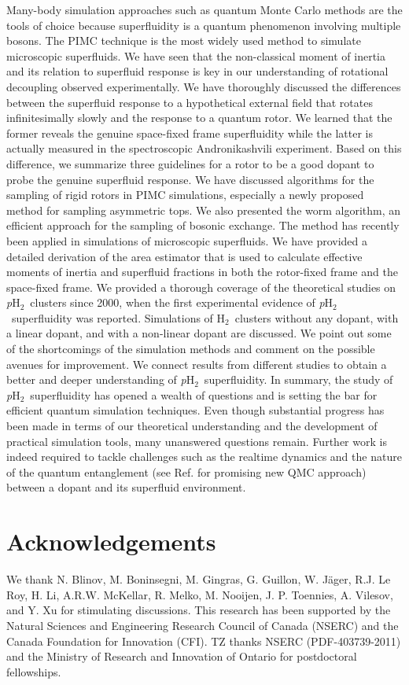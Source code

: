 \documentclass[12pt]{iopart}
\newcommand{\hydrogen}{H$_2$}
\newcommand{\phtwo}{{\em p}H$_2$}
\begin{document}
Many-body simulation approaches such as quantum Monte Carlo methods are the tools of choice because superfluidity is a quantum phenomenon involving multiple bosons. 
The PIMC technique is the most widely used method to simulate microscopic superfluids. We have seen that the non-classical moment of inertia and its relation to superfluid response is key in our understanding of rotational decoupling observed experimentally. 
We have thoroughly discussed the differences between the superfluid response to a hypothetical external field that rotates infinitesimally slowly and the response to a quantum rotor. We learned that the former reveals the genuine space-fixed frame superfluidity while the latter is actually measured in the spectroscopic Andronikashvili experiment. Based on this difference, we summarize three guidelines for a rotor to be a good dopant to probe the genuine superfluid response.
We have discussed  algorithms for the sampling of rigid rotors in PIMC simulations, especially a newly proposed method for sampling asymmetric tops. 
We also presented the worm algorithm, an efficient approach for the sampling of bosonic exchange.
The method has  recently been applied in simulations of microscopic superfluids.
We have provided a detailed derivation of the area estimator that is used to calculate effective moments of inertia and superfluid fractions in both the rotor-fixed  frame and the space-fixed frame.
We provided a thorough coverage of the theoretical studies on \phtwo~clusters since 2000, when the first experimental evidence of \phtwo~superfluidity was reported. Simulations of \hydrogen~clusters without any dopant, with a linear dopant, and with a non-linear dopant are discussed. 
We point out some of the shortcomings of the simulation methods and comment on the possible avenues for improvement. 
We connect results from different studies to obtain a better and deeper understanding of \phtwo~superfluidity. 
In summary, the study of \phtwo~superfluidity has opened a wealth of questions and is setting the bar for efficient quantum simulation techniques. 
Even though substantial progress has been made in terms of our theoretical understanding and the development of practical simulation tools, many unanswered questions remain. Further work is indeed required to tackle challenges such as the realtime dynamics and the nature of the quantum entanglement (see Ref. \cite{herdman2013particle} for promising new QMC approach) between a dopant and its superfluid environment.

\section*{Acknowledgements}
We thank N. Blinov, M. Boninsegni, M. Gingras, G. Guillon, W. J\"ager, R.J. Le Roy, H. Li,  A.R.W. McKellar, R. Melko, M. Nooijen, J. P. Toennies, A. Vilesov, and  Y. Xu for stimulating discussions.
This research has been supported by the Natural Sciences and Engineering Research Council of Canada (NSERC) and the Canada Foundation for Innovation (CFI). TZ thanks NSERC (PDF-403739-2011) and the Ministry of Research and Innovation of Ontario for postdoctoral fellowships.
\end{document}
